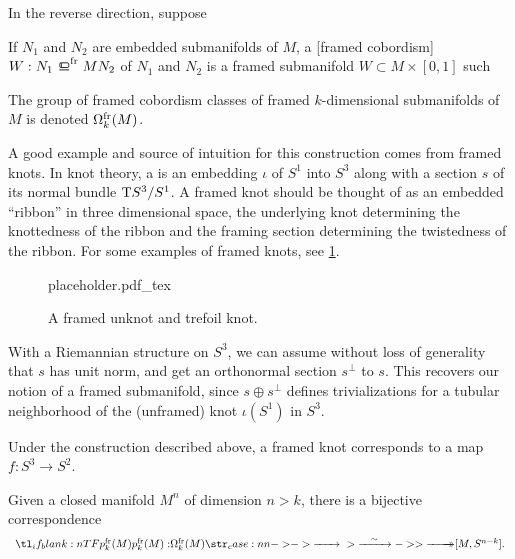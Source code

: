 In the reverse direction, suppose 

\begin{definition}
	If $N_1$ and $N_2$ are embedded submanifolds of $M$, a [framed cobordism] $W : N_1 \frbord{M} N_2$ of $N_1$ and $N_2$ is a framed submanifold $W\subset M\times [0,1]$ such 
\end{definition}

\begin{definition}
	The group of framed cobordism classes of framed $k$-dimensional submanifolds of $M$ is denoted $\Omega^{\mathrm{fr}}_k(M)$.
\end{definition}

A good example and source of intuition for this construction comes from framed knots. In knot theory, a  is an embedding $\iota$ of $S^1$ into $S^3$ along with a section $s$ of its normal bundle $\mathrm{T} S^3/S^1$. A framed knot should be thought of as an embedded ``ribbon'' in three dimensional space, the underlying knot determining the knottedness of the ribbon and the framing section determining the twistedness of the ribbon. For some examples of framed knots, see \cref{fig:framed-knot-examples}.

\begin{figure}[ht]
	\centering
	{placeholder.pdf_tex}
	\caption{A framed unknot and trefoil knot.}\label{fig:framed-knot-examples}
\end{figure}

\begin{remark}
With a Riemannian structure on $S^3$, we can assume without loss of generality that $s$ has unit norm, and get an orthonormal section $s^\perp$ to $s$. This recovers our notion of a framed submanifold, since $s\oplus s^\perp$ defines trivializations for a tubular neighborhood of the (unframed) knot $\iota(S^1)$ in $S^3$.
\end{remark}

Under the construction described above, a framed knot corresponds to a map $f : S^3\to S^{2}$.

\begin{theorem}\label{thm:thom-pontryagin-isomorphism}
	Given a closed manifold $M^n$ of dimension $n>k$, there is a bijective correspondence
	\begin{equation}
		\lkxfunc{p^\fr_k(M)}{\Omega^\fr_k(M)}{{}[M, S^{n-k}].}
	\end{equation}
\end{theorem}

